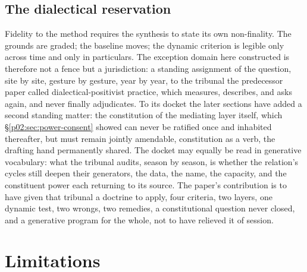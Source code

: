 \subsection{The dialectical reservation}
\label{p02:sec:implications-reservation}

Fidelity to the method requires the synthesis to state its own non-finality. The grounds are graded; the baseline moves; the dynamic criterion is legible only across time and only in particulars. The exception domain here constructed is therefore not a fence but a jurisdiction: a standing assignment of the question, site by site, gesture by gesture, year by year, to the tribunal the predecessor paper called dialectical-positivist practice, which measures, describes, and asks again, and never finally adjudicates. To its docket the later sections have added a second standing matter: the constitution of the mediating layer itself, which \S\ref{p02:sec:power-consent} showed can never be ratified once and inhabited thereafter, but must remain jointly amendable, constitution as a verb, the drafting hand permanently shared. The docket may equally be read in generative vocabulary: what the tribunal audits, season by season, is whether the relation's cycles still deepen their generators, the data, the name, the capacity, and the constituent power each returning to its source. The paper's contribution is to have given that tribunal a doctrine to apply, four criteria, two layers, one dynamic test, two wrongs, two remedies, a constitutional question never closed, and a generative program for the whole, not to have relieved it of session.

\section{Limitations}
\label{p02:sec:limits}

